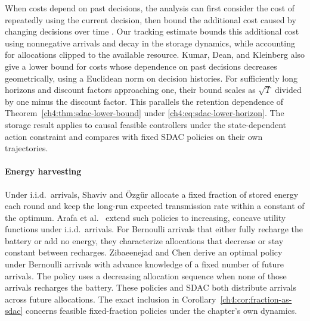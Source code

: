 When costs depend on past decisions, the analysis can first consider the
cost of repeatedly using the current decision, then bound the additional
cost caused by changing decisions over time
\cite{anava2015memory,kumar2023unbounded}. Our tracking estimate bounds
this additional cost using nonnegative arrivals and decay in the storage
dynamics, while accounting for allocations clipped to the available resource.
Kumar, Dean, and Kleinberg \cite{kumar2023unbounded} also give a lower
bound for costs whose dependence on past decisions decreases geometrically,
using a Euclidean norm on decision histories. For sufficiently long
horizons and discount factors approaching one, their bound scales as
$\sqrt T$ divided by one minus the discount factor. This parallels the
retention dependence of Theorem~\ref{ch4:thm:sdac-lower-bound}
under \eqref{ch4:eq:sdac-lower-horizon}. The storage result applies to
causal feasible controllers under the state-dependent action constraint
and compares with fixed SDAC policies on their own trajectories.

\paragraph{Energy harvesting}
Under i.i.d.\ arrivals, Shaviv and \"Ozg\"ur
\cite{shaviv2016universally} allocate a fixed fraction of stored energy
each round and keep the long-run expected transmission rate within a
constant of the optimum. Arafa et al.\ \cite{arafa2018online} extend such
policies to increasing, concave utility functions under i.i.d.\ arrivals.
For Bernoulli arrivals that either fully recharge the battery or add no
energy, they characterize allocations that decrease or stay constant
between recharges. Zibaeenejad and Chen \cite{zibaeenejad2019lookahead}
derive an optimal policy under Bernoulli arrivals with advance knowledge
of a fixed number of future arrivals. The policy uses a decreasing
allocation sequence when none of those arrivals recharges the battery.
These policies and SDAC both distribute arrivals across future allocations.
The exact inclusion in
Corollary~\ref{ch4:cor:fraction-as-sdac} concerns feasible fixed-fraction
policies under the chapter's own dynamics.

